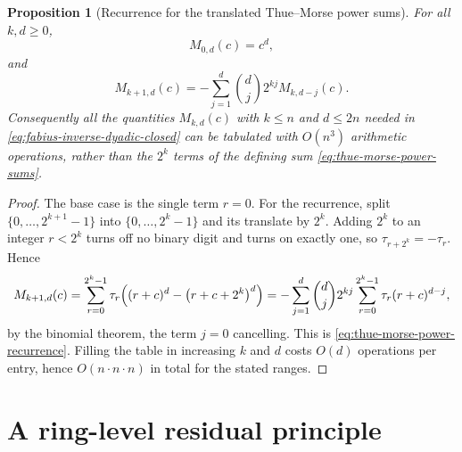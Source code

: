 \documentclass[11pt,a4paper,oneside,openany]{book}
\newtheorem{proposition}[proposition]{Proposition}
\theoremstyle{definition}
\theoremstyle{remark}
\begin{document}

\begin{proposition}[Recurrence for the translated Thue--Morse power sums]\label{prop:thue-morse-power-recurrence}
For all $k,d\ge0$,
\begin{equation}\label{eq:thue-morse-power-base}
 M_{0,d}(c)=c^d,
\end{equation}
and
\begin{equation}\label{eq:thue-morse-power-recurrence}
 M_{k+1,d}(c)=-\sum_{j=1}^{d}\binom dj2^{kj}M_{k,d-j}(c).
\end{equation}
Consequently all the quantities $M_{k,d}(c)$ with $k\le n$ and $d\le2n$ needed in \eqref{eq:fabius-inverse-dyadic-closed} can be tabulated with $O(n^3)$ arithmetic operations, rather than the $2^k$ terms of the defining sum \eqref{eq:thue-morse-power-sums}.
\end{proposition}

\begin{proof}
The base case is the single term $r=0$.  For the recurrence, split $\{0,\dots,2^{k+1}-1\}$ into $\{0,\dots,2^k-1\}$ and its translate by $2^k$.  Adding $2^k$ to an integer $r<2^k$ turns off no binary digit and turns on exactly one, so $\tau_{r+2^k}=-\tau_r$.  Hence
\[
 M_{k+1,d}(c)
 =\sum_{r=0}^{2^k-1}\tau_r\Bigl((r+c)^d-\bigl(r+c+2^k\bigr)^d\Bigr)
 =-\sum_{j=1}^{d}\binom dj2^{kj}\sum_{r=0}^{2^k-1}\tau_r(r+c)^{d-j},
\]
by the binomial theorem, the term $j=0$ cancelling.  This is \eqref{eq:thue-morse-power-recurrence}.  Filling the table in increasing $k$ and $d$ costs $O(d)$ operations per entry, hence $O(n\cdot n\cdot n)$ in total for the stated ranges.
\end{proof}


\section{A ring-level residual principle}
\end{document}
